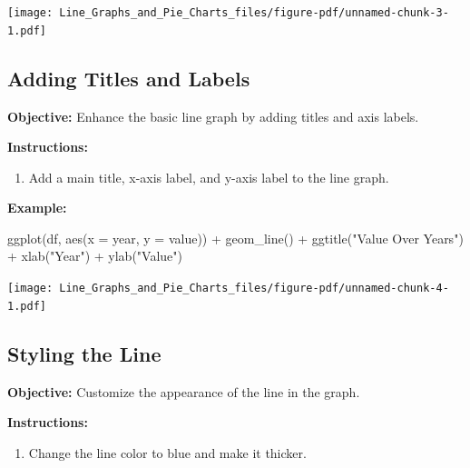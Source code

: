 \documentclass[
  letterpaper,
  DIV=11,
  numbers=noendperiod]{scrreprt}
\newenvironment{Shaded}{\begin{snugshade}}{\end{snugshade}}
\newcommand{\AttributeTok}[1]{\textcolor[rgb]{0.40,0.45,0.13}{#1}}
\newcommand{\FunctionTok}[1]{\textcolor[rgb]{0.28,0.35,0.67}{#1}}
\newcommand{\NormalTok}[1]{\textcolor[rgb]{0.00,0.23,0.31}{#1}}
\newcommand{\SpecialCharTok}[1]{\textcolor[rgb]{0.37,0.37,0.37}{#1}}
\newcommand{\StringTok}[1]{\textcolor[rgb]{0.13,0.47,0.30}{#1}}
\providecommand{\tightlist}{%
  \setlength{\itemsep}{0pt}\setlength{\parskip}{0pt}}\usepackage{longtable,booktabs,array}
\begin{document}
\texttt{[image: Line\_Graphs\_and\_Pie\_Charts\_files/figure-pdf/unnamed-chunk-3-1.pdf]}

\subsection*{Adding Titles and Labels}\label{adding-titles-and-labels}

\textbf{Objective:} Enhance the basic line graph by adding titles and
axis labels.

\textbf{Instructions:}

\begin{enumerate}
\def\labelenumi{\arabic{enumi}.}
\tightlist
\item
  Add a main title, x-axis label, and y-axis label to the line graph.
\end{enumerate}

\textbf{Example:}

\begin{Shaded}
\begin{Highlighting}[]
\FunctionTok{ggplot}\NormalTok{(df, }\FunctionTok{aes}\NormalTok{(}\AttributeTok{x =}\NormalTok{ year, }\AttributeTok{y =}\NormalTok{ value)) }\SpecialCharTok{+}
  \FunctionTok{geom\_line}\NormalTok{() }\SpecialCharTok{+}
  \FunctionTok{ggtitle}\NormalTok{(}\StringTok{"Value Over Years"}\NormalTok{) }\SpecialCharTok{+}
  \FunctionTok{xlab}\NormalTok{(}\StringTok{"Year"}\NormalTok{) }\SpecialCharTok{+}
  \FunctionTok{ylab}\NormalTok{(}\StringTok{"Value"}\NormalTok{)}
\end{Highlighting}
\end{Shaded}

\texttt{[image: Line\_Graphs\_and\_Pie\_Charts\_files/figure-pdf/unnamed-chunk-4-1.pdf]}

\subsection*{Styling the Line}\label{styling-the-line}

\textbf{Objective:} Customize the appearance of the line in the graph.

\textbf{Instructions:}

\begin{enumerate}
\def\labelenumi{\arabic{enumi}.}
\tightlist
\item
  Change the line color to blue and make it thicker.
\end{enumerate}
\end{document}
